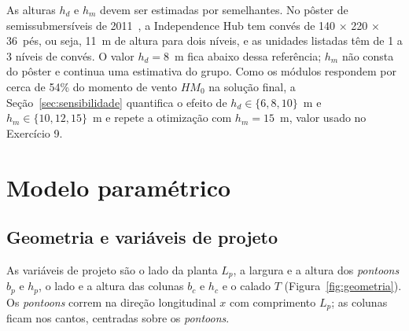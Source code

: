 \documentclass[11pt,a4paper]{article}
\begin{document}
As alturas $h_d$ e $h_m$ devem ser estimadas por semelhantes. No pôster de semissubmersíveis de
2011~\cite{poster}, a Independence Hub tem convés de 140 × 220 × 36~pés, ou seja, 11~m de altura
para dois níveis, e as unidades listadas têm de 1 a 3 níveis de convés. O valor $h_d = 8$~m fica
abaixo dessa referência; $h_m$ não consta do pôster e continua uma estimativa do grupo. Como os módulos respondem por cerca de 54\% do momento
de vento $HM_0$ na solução final, a Seção~\ref{sec:sensibilidade} quantifica o efeito de
$h_d \in \{6, 8, 10\}$~m e $h_m \in \{10, 12, 15\}$~m e repete a otimização com
$h_m = 15$~m, valor usado no Exercício 9.

\section{Modelo paramétrico}\label{sec:modelo}

\subsection{Geometria e variáveis de projeto}

As variáveis de projeto são o lado da planta $L_p$, a largura e a altura dos \emph{pontoons}
$b_p$ e $h_p$, o lado e a altura das colunas $b_c$ e $h_c$ e o calado $T$
(Figura~\ref{fig:geometria}). Os \emph{pontoons} correm na direção longitudinal $x$ com
comprimento $L_p$; as colunas ficam nos cantos, centradas sobre os \emph{pontoons}.
\end{document}
